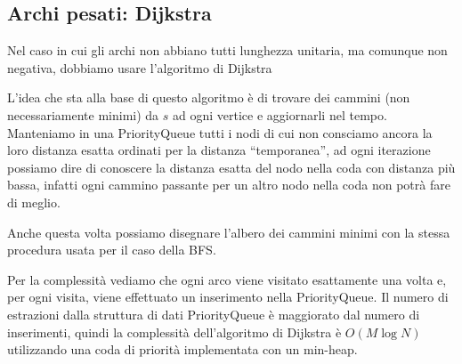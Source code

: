 \documentclass[a4paper,10pt]{amsbook}
\theoremstyle{plain}
\theoremstyle{definition}
\theoremstyle{remark}
\begin{document}
\subsection{Archi pesati: Dijkstra}

Nel caso in cui gli archi non abbiano tutti lunghezza unitaria, ma
comunque non negativa, dobbiamo usare l'algoritmo di Dijkstra

\begin{figure}[H]
  \begin{algorithmic}
     
    \EndFor
        
     
      
      
    \EndIf
    \EndFor
    \EndWhile
  \end{algorithmic}
\end{figure}
L'idea che sta alla base di questo algoritmo \`e di trovare dei
cammini (non necessariamente minimi) da $s$ ad ogni vertice e
aggiornarli nel tempo. Manteniamo in una PriorityQueue tutti i
nodi di cui non consciamo ancora la loro distanza esatta ordinati per
la distanza ``temporanea'', ad ogni iterazione possiamo dire di
conoscere la distanza esatta del nodo nella coda con distanza pi\`u
bassa, infatti ogni cammino passante per un altro nodo nella coda non
potr\`a fare di meglio.


Anche questa volta possiamo disegnare l'albero dei cammini minimi con
la stessa procedura usata per il caso della BFS.

Per la complessit\`a vediamo che ogni arco viene visitato esattamente
una volta e, per ogni visita, viene effettuato un inserimento nella
PriorityQueue. Il numero di estrazioni dalla struttura di dati
PriorityQueue \`e maggiorato dal numero di inserimenti, quindi la
complessit\`a dell'algoritmo di Dijkstra \`e $O(M\log N)$ utilizzando
una coda di priorit\`a implementata con un min-heap.
\end{document}
